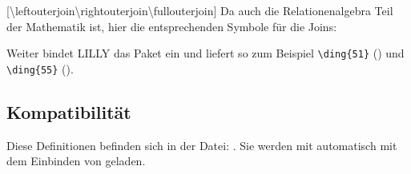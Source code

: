 [\cmdlist \textbackslash leftouterjoin\cmdlist \textbackslash rightouterjoin\cmdlist \textbackslash fullouterjoin]
Da auch die Relationenalgebra Teil der Mathematik ist, hier die entsprechenden Symbole für die Joins:
%
%
%
\begin{bemerkung}
    Weiter bindet LILLY das  Paket ein und liefert so zum Beispiel \verb|\ding{51}| () und \verb|\ding{55}| ().
\end{bemerkung}









\subsection[Kompatibilität \LILLYxBOXxVersion{\small 1.0.3}]{Kompatibilität}
Diese Definitionen befinden sich in der Datei: . Sie werden mit  automatisch mit dem Einbinden von  geladen.\medskip

